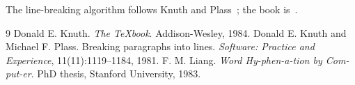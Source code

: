 \documentclass[12pt]{article}
\begin{document}
\pagestyle{empty}

The line-breaking algorithm follows Knuth and Plass~\cite{plass81}; the
book is~\cite{knuth84}.

\begin{thebibliography}{9}
 Donald E. Knuth. \emph{The \TeX book}. Addison-Wesley, 1984.
 Donald E. Knuth and Michael F. Plass. Breaking paragraphs
  into lines. \emph{Software: Practice and Experience}, 11(11):1119--1184, 1981.
 F. M. Liang.
\newblock \emph{Word Hy-phen-a-tion by Com-put-er}.
\newblock PhD thesis, Stanford University, 1983.
\end{thebibliography}
\end{document}
